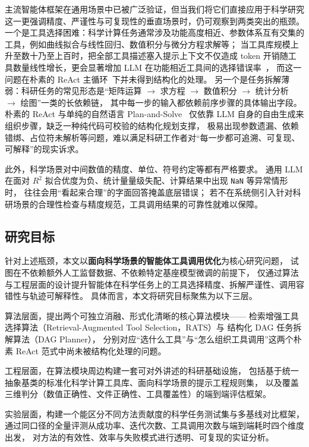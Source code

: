 主流智能体框架在通用场景中已被广泛验证，但当我们将它们直接应用于科学研究这一更强调精度、严谨性与可复现性的垂直场景时，仍可观察到两类突出的瓶颈。
一个是工具选择困难：科学计算任务通常涉及功能高度相近、参数体系互有交集的工具，例如曲线拟合与线性回归、数值积分与微分方程求解等；
当工具库规模上升至数十乃至上百时，把全部工具描述塞入提示上下文不仅造成 token 开销随工具数量线性增长，更会显著增加 LLM 在功能相近工具间的选择错误率~\cite{qin2023toollearning}，
而这一问题在朴素的 ReAct 主循环~\cite{yao2023react}下并未得到结构化的处理。
另一个是任务拆解薄弱：科研任务的常见形态是“矩阵运算 $\rightarrow$ 求方程 $\rightarrow$ 数值积分 $\rightarrow$ 统计分析 $\rightarrow$ 绘图”一类的长依赖链，
其中每一步的输入都依赖前序步骤的具体输出字段。
朴素的 ReAct 与单纯的自然语言 Plan-and-Solve~\cite{wang2023plansolve} 仅依靠 LLM 自身的自由生成来组织步骤，缺乏一种纯代码可校验的结构化规划支撑，
极易出现参数遗漏、依赖错绑、占位符未解析等问题，难以满足科研工作者对“每一步都可追溯、可复现、可解释”的现实诉求。

此外，科学场景对中间数值的精度、单位、符号约定等都有严格要求。
通用 LLM 在面对 $R^2$ 拟合优度为负、统计量量级失配、计算结果中出现 \texttt{NaN} 等异常情形时，
往往会用“看起来合理”的字面回答掩盖底层错误；
若不在系统侧引入针对科研场景的合理性检查与精度规范，工具调用结果的可靠性就难以保障。

\subsection{研究目标}

针对上述瓶颈，本文以\textbf{面向科学场景的智能体工具调用优化}为核心研究问题，
试图在不依赖额外人工监督数据、不依赖特定基座模型微调的前提下，
仅通过算法与工程层面的设计提升智能体在科学任务上的工具选择精度、拆解严谨性、调用容错性与轨迹可解释性。
具体而言，本文将研究目标聚焦为以下三层。

算法层面，提出两个可独立消融、形式化清晰的核心算法模块——
检索增强工具选择算法（Retrieval-Augmented Tool Selection，RATS）与
结构化 DAG 任务拆解算法（DAG Planner），
分别对应“选什么工具”与“怎么组织工具调用”这两个朴素 ReAct 范式中尚未被结构化处理的问题。

工程层面，在算法模块周边构建一套可对外讲述的科研基础设施，
包括基于统一抽象基类的标准化科学计算工具库、面向科学场景的提示工程规则集，
以及覆盖三维判分（数值正确性、文件正确性、工具覆盖性）的端到端评估框架。

实验层面，构建一个能区分不同方法贡献度的科学任务测试集与多基线对比框架，
通过同口径的全量评测从成功率、迭代次数、工具调用次数与端到端耗时四个维度出发，
对方法的有效性、效率与失败模式进行透明、可复现的实证分析。

